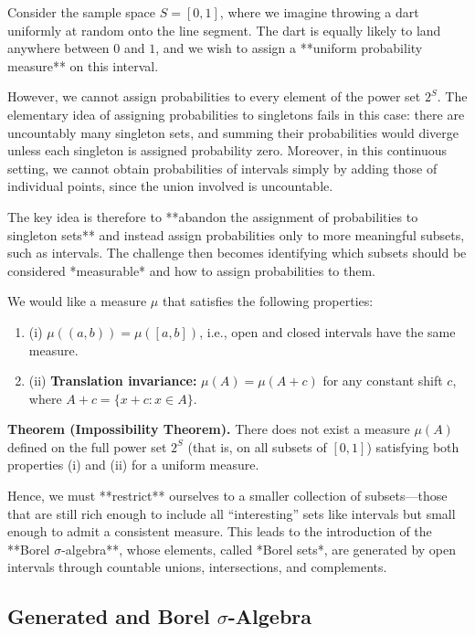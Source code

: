 Consider the sample space $S = [0, 1]$, where we imagine throwing a dart uniformly at random onto the line segment. The dart is equally likely to land anywhere between $0$ and $1$, and we wish to assign a **uniform probability measure** on this interval.

However, we cannot assign probabilities to every element of the power set $2^S$. The elementary idea of assigning probabilities to singletons fails in this case: there are uncountably many singleton sets, and summing their probabilities would diverge unless each singleton is assigned probability zero. Moreover, in this continuous setting, we cannot obtain probabilities of intervals simply by adding those of individual points, since the union involved is uncountable.

The key idea is therefore to **abandon the assignment of probabilities to singleton sets** and instead assign probabilities only to more meaningful subsets, such as intervals. The challenge then becomes identifying which subsets should be considered *measurable* and how to assign probabilities to them.

We would like a measure $\mu$ that satisfies the following properties:
\begin{enumerate}
    \item (i) $\mu((a, b)) = \mu([a, b])$, i.e., open and closed intervals have the same measure.
    \item (ii) \textbf{Translation invariance:} $\mu(A) = \mu(A + c)$ for any constant shift $c$, where $A + c = \{x + c : x \in A\}$.
\end{enumerate}

\textbf{Theorem (Impossibility Theorem).}  
There does not exist a measure $\mu(A)$ defined on the full power set $2^S$ (that is, on all subsets of $[0,1]$) satisfying both properties (i) and (ii) for a uniform measure.

Hence, we must **restrict** ourselves to a smaller collection of subsets—those that are still rich enough to include all “interesting” sets like intervals but small enough to admit a consistent measure. This leads to the introduction of the **Borel $\sigma$-algebra**, whose elements, called *Borel sets*, are generated by open intervals through countable unions, intersections, and complements.


\subsection{Generated and Borel $\sigma$-Algebra}

